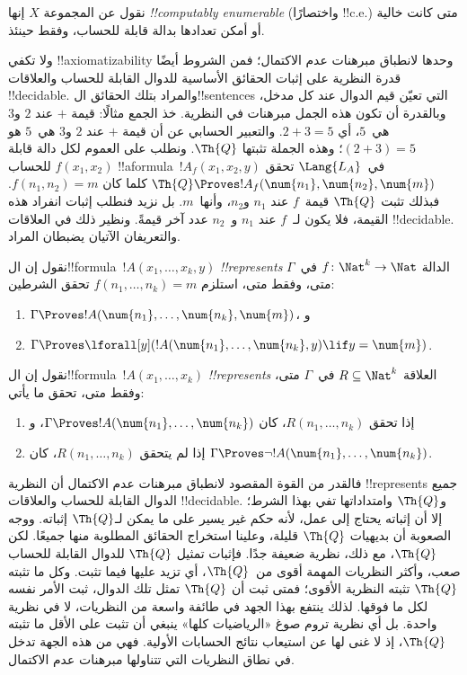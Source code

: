 \documentclass[../../../include/open-logic-section]{subfiles}
\begin{document}
\begin{defn}
نقول عن المجموعة $X$ إنها \emph{!!{computably enumerable}} (واختصارًا
!!{c.e.}) متى كانت خالية أو أمكن تعدادها بدالة قابلة للحساب، وفقط حينئذ.
\end{defn}

ولا تكفي !!{axiomatizability} وحدها لانطباق مبرهنات
عدم الاكتمال؛ فمن الشروط أيضًا قدرة النظرية على إثبات
الحقائق الأساسية للدوال القابلة للحساب والعلاقات
!!{decidable}. والمراد بتلك الحقائق ال!!{sentence}s
التي تعيّن قيم الدوال عند كل مدخل، وبالقدرة أن تكون
هذه الجمل مبرهنات في النظرية. خذ الجمع مثالًا:
قيمة $+$ عند $2$ و$3$ هي~$5$، أي $2+3=5$.
والتعبير الحسابي عن أن قيمة $+$ عند $2$ و$3$
هي~$5$ هو $(\num{2}+\num{3})=\num{5}$؛ وهذه
الجملة تثبتها $\Th{Q}$. ونطلب على العموم لكل
دالة قابلة للحساب $f(x_1,x_2)$
!!a{formula}~$!A_f(x_1,x_2,y)$ في~$\Lang{L_A}$
تحقق $\Th{Q}\Proves !A_f(\num{n_1},\num{n_2},\num{m})$
كلما كان $f(n_1,n_2)=m$. فبذلك تثبت $\Th{Q}$
قيمة~$f$ عند $n_1$ و$n_2$، وأنها~$m$.
بل نزيد فنطلب إثبات انفراد هذه القيمة، فلا يكون
لـ~$f$ عند $n_1$ و~$n_2$ عدد آخر قيمةً.
ونظير ذلك في العلاقات !!{decidable}.
والتعريفان الآتيان يضبطان المراد.

\begin{defn}
نقول إن ال!!{formula}~$!A(x_1,\dots,x_k,y)$ \emph{!!{represents}} الدالة
$f\colon\Nat^k\to\Nat$ في~$\Gamma$ متى، وفقط متى، استلزم
$f(n_1,\dots,n_k)=m$ تحقق الشرطين:
\begin{enumerate}
\item $\Gamma \Proves !A(\num{n_1}, \dots, \num{n_k}, \num{m})$، و
\item $\Gamma \Proves \lforall[y](!A(\num{n_1}, \dots, \num{n_k},
y) \lif y = \num{m})$.
\end{enumerate}
\end{defn}

\begin{defn}
نقول إن ال!!{formula}~$!A(x_1,\dots,x_k)$ \emph{!!{represents}} العلاقة
$R\subseteq\Nat^k$ في~$\Gamma$ متى، وفقط متى، تحقق ما يأتي:
\begin{enumerate}
\item إذا تحقق $R(n_1,\dots,n_k)$، كان
$\Gamma\Proves !A(\num{n_1},\dots,\num{n_k})$، و
\item إذا لم يتحقق $R(n_1,\dots,n_k)$، كان $\Gamma\Proves\lnot
!A(\num{n_1},\dots,\num{n_k})$.
\end{enumerate}
\end{defn}

فالقدر من القوة المقصود لانطباق مبرهنات عدم الاكتمال
أن النظرية !!{represents} جميع الدوال القابلة للحساب
والعلاقات !!{decidable}. و$\Th{Q}$ وامتداداتها
تفي بهذا الشرط؛ إلا أن إثباته يحتاج إلى عمل،
لأنه حكم غير يسير على ما يمكن لـ$\Th{Q}$ إثباته.
ووجه الصعوبة أن بديهيات $\Th{Q}$ قليلة،
وعلينا استخراج الحقائق المطلوبة منها جميعًا.
لكن $\Th{Q}$، مع ذلك، نظرية ضعيفة جدًا.
فإثبات تمثيل $\Th{Q}$ للدوال القابلة للحساب
صعب، وأكثر النظريات المهمة أقوى من~$\Th{Q}$،
أي تزيد عليها فيما تثبت. وكل ما تثبته
$\Th{Q}$ تثبته النظرية الأقوى؛ فمتى ثبت
أن $\Th{Q}$ تمثل تلك الدوال، ثبت الأمر نفسه
لكل ما فوقها. لذلك ينتفع بهذا الجهد في طائفة
واسعة من النظريات، لا في نظرية واحدة.
بل أي نظرية تروم صوغ «الرياضيات كلها» ينبغي
أن تثبت على الأقل ما تثبته $\Th{Q}$،
إذ لا غنى لها عن استيعاب نتائج الحسابات
الأولية. فهي من هذه الجهة تدخل في نطاق
النظريات التي تتناولها مبرهنات عدم الاكتمال.
\end{document}
